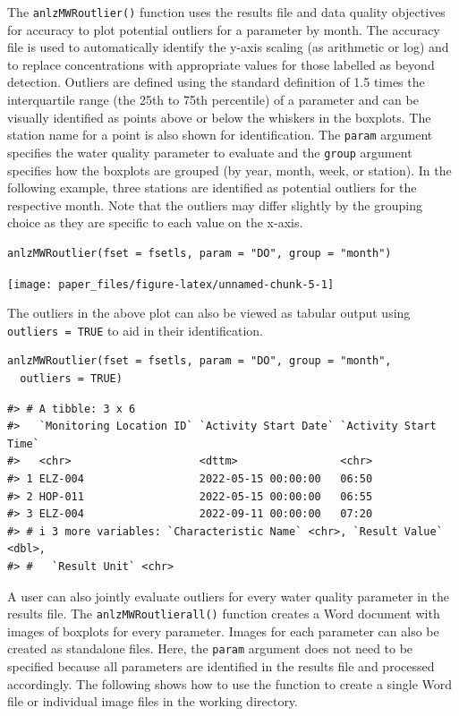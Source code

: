 The \texttt{anlzMWRoutlier()} function uses the results file and data quality objectives for accuracy to plot potential outliers for a parameter by month. The accuracy file is used to automatically identify the y-axis scaling (as arithmetic or log) and to replace concentrations with appropriate values for those labelled as beyond detection. Outliers are defined using the standard definition of 1.5 times the interquartile range (the 25th to 75th percentile) of a parameter and can be visually identified as points above or below the whiskers in the boxplots. The station name for a point is also shown for identification. The \texttt{param} argument specifies the water quality parameter to evaluate and the \texttt{group} argument specifies how the boxplots are grouped (by year, month, week, or station). In the following example, three stations are identified as potential outliers for the respective month. Note that the outliers may differ slightly by the grouping choice as they are specific to each value on the x-axis.

\begin{verbatim}
anlzMWRoutlier(fset = fsetls, param = "DO", group = "month")
\end{verbatim}

\begin{center}\texttt{[image: paper\_files/figure-latex/unnamed-chunk-5-1]} \end{center}

The outliers in the above plot can also be viewed as tabular output using \texttt{outliers\ =\ TRUE} to aid in their identification.

\begin{verbatim}
anlzMWRoutlier(fset = fsetls, param = "DO", group = "month", 
  outliers = TRUE)
\end{verbatim}

\begin{verbatim}
#> # A tibble: 3 x 6
#>   `Monitoring Location ID` `Activity Start Date` `Activity Start Time`
#>   <chr>                    <dttm>                <chr>                
#> 1 ELZ-004                  2022-05-15 00:00:00   06:50                
#> 2 HOP-011                  2022-05-15 00:00:00   06:55                
#> 3 ELZ-004                  2022-09-11 00:00:00   07:20                
#> # i 3 more variables: `Characteristic Name` <chr>, `Result Value` <dbl>,
#> #   `Result Unit` <chr>
\end{verbatim}

A user can also jointly evaluate outliers for every water quality parameter in the results file. The \texttt{anlzMWRoutlierall()} function creates a Word document with images of boxplots for every parameter. Images for each parameter can also be created as standalone files. Here, the \texttt{param} argument does not need to be specified because all parameters are identified in the results file and processed accordingly. The following shows how to use the function to create a single Word file or individual image files in the working directory.

